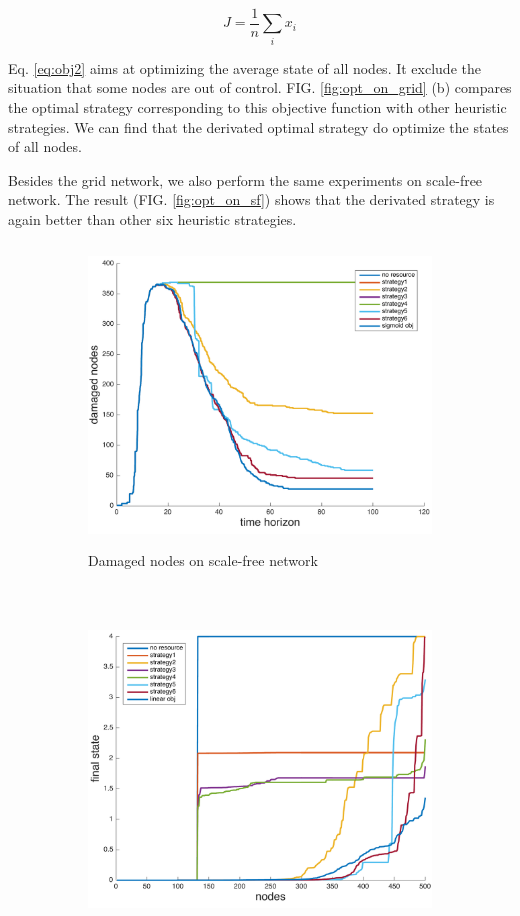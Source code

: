 \begin{equation}
\label{eq:obj2}
	J = \frac{1}{n} \sum_i x_i
\end{equation}

Eq. \ref{eq:obj2} aims at optimizing the average state of all nodes. It exclude the situation that some nodes are out of control. FIG. \ref{fig:opt_on_grid} (b) compares the optimal strategy corresponding to this objective function with other heuristic strategies. We can find that the derivated optimal strategy do optimize the states of all nodes.


Besides the grid network, we also perform the same experiments on scale-free network. The result (FIG. \ref{fig:opt_on_sf}) shows that the derivated strategy is again better than other six heuristic strategies.

\begin{figure}	
	\centering
	\begin{subfigure}[t]{0.8\textwidth}
		\centering
		\includegraphics[height=80mm]{../figs/no_linear_approximation/SF_damaged_small.pdf}
		\caption{Damaged nodes on scale-free network}
	\end{subfigure}
	~
	\begin{subfigure}[t]{0.8\textwidth}
		\centering
		\includegraphics[height=80mm]{../figs/no_linear_approximation/SF_finalState_small.pdf}

\end{subfigure}
\end{figure}
